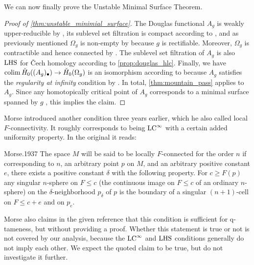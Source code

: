 We can now finally prove the Unstable Minimal Surface Theorem.


\begin{proof}[Proof of \cref{thm:unstable_minimial_surface}]
    The Douglas functional $A_g$ is weakly upper-reducible by \cite[Theorem 5.1]{Morse.1939}, its sublevel set filtration is compact according to \cite[p.~448]{Morse.1939}, and as previously mentioned $\Omega_g$ is non-empty by \cite[p.~267-268]{Douglas.1931} because $g$ is rectifiable.
    Moreover, $\Omega_g$ is contractible and hence connected by \cite[Theorem 4.3]{Morse.1939}.
    The sublevel set filtration of $A_g$ is also $\mathrm{LHS}$ for \v{C}ech homology according to \cref{prop:douglas_hlc}.
    Finally, we have $\operatorname*{colim} \check{H}_0((A_g)_{\bullet}) \to \check{H}_0(\Omega_g)$ is an isomorphism according to \cite[p.~444]{Morse.1939} because $A_g$ satisfies the \emph{regularity at infinity} condition by \cite[Theorem 4.3]{Morse.1939}.
    In total, \cref{thm:mountain_pass} applies to $A_g$.
    Since any homotopically critical point of $A_g$ corresponds to a minimal surface spanned by $g$ \cite[Theorem 6.2]{Morse.1939}, this implies the claim.
\end{proof}

\begin{rem}
Morse introduced another condition three years earlier, which he also called local $F$-connectivity.
It roughly corresponds to being $\mathrm{LC}^\infty$ with a certain added uniformity property.
In the original it reads:
\begin{displaycquote}[p.421--422]{Morse.1937}
	The space $M$ will be said to be locally $F$-connected for the order $n$ if corresponding to $n$, an arbitrary point $p$ on $M$, and an arbitrary positive constant $e$, there exists a positive constant $\delta$ with the following property.
	For $c \geq F(p)$ any singular $n$-sphere on $F \leq c$ (the continuous image on $F \leq c$ of an ordinary $n$-sphere) on the $\delta$-neighborhood $p_{\delta}$ of $p$ is the boundary of a singular $(n + 1)$-cell on $F \leq c + e$ and on $p_e$.
\end{displaycquote}
Morse also claims in the given reference that this condition is sufficient for q-tameness, but without providing a proof.
Whether this statement is true or not is not covered by our analysis, because the $\mathrm{LC}^\infty$ and $\mathrm{LHS}$ conditions generally do not imply each other.
We expect the quoted claim to be true, but do not investigate it further.
\end{rem}